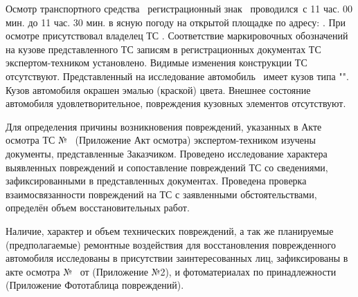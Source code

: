 \noindent \begin{spacing}{1.2} { Осмотр транспортного средства \, регистрационный знак  \, проводился \osm\,с 11 час. 00 мин. до 11 час. 30 мин. в  ясную погоду  на открытой площадке по адресу: . При осмотре присутствовал  владелец ТС . %
Соответствие маркировочных обозначений на кузове представленного ТС записям в регистрационных документах ТС экс\-пертом-техником установлено. Видимые изменения конструкции ТС отсутствуют.  Представленный на исследование автомобиль \tc\, имеет кузов типа "". Кузов автомобиля окрашен  
эмалью (краской) \colr цвета. Внешнее состояние автомобиля удовлетворительное, повреждения  кузовных элементов отсутствуют.  %
\par Для определения причины возникновения повреждений, указанных в Акте осмотра ТС 
№ \NomerDoc \, (Приложение Акт осмотра) 
экспертом-техником изучены документы, представленные Заказчиком.  %
Проведено исследование характера выявленных повреждений и сопоставление повреждений ТС  
со сведениями, зафиксированными в представленных документах. %
Проведена проверка взаимосвязанности повреждений на ТС с заявленными обстоятельствами, определён объем восстановительных работ.%
\par Наличие, характер и объем технических повреждений, а так же  планируемые (предполагаемые) ремонтные воздействия для восстановления поврежденного автомобиля  исследованы в присутствии заинтересованных лиц, зафиксированы в акте осмотра № \NomerDoc \,  от \osm  (Приложение №2),  и фотоматериалах по принадлежности (Приложение Фототаблица повреждений).  }
\end{spacing}
%
%
